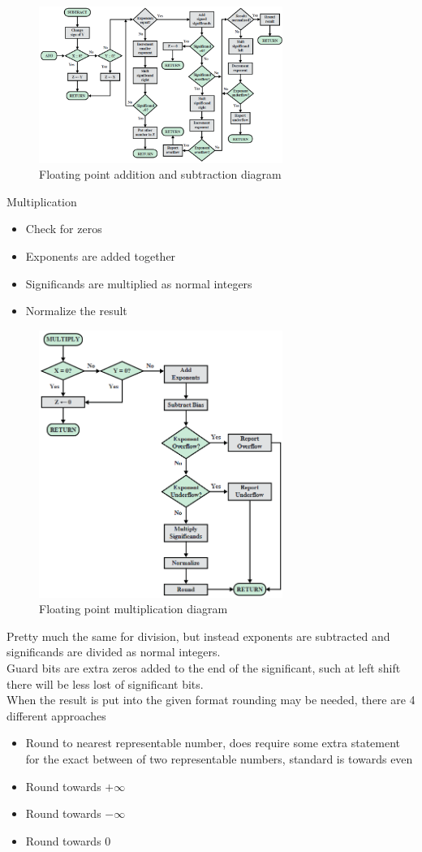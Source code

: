 \documentclass[12pt, a4paper]{article}
\begin{document}
			\begin{figure}[h!]
				\includegraphics[width=300px]{assets/floatingpointAddSub.png}
				\centering
				\caption{Floating point addition and subtraction diagram}
			\end{figure}
			Multiplication
			\begin{itemize}
				\item Check for zeros
				\item Exponents are added together
				\item Significands are multiplied as normal integers
				\item Normalize the result
			\end{itemize}
			\begin{figure}[h!]
				\includegraphics[width=300px]{assets/floatingpointMulti.png}
				\centering
				\caption{Floating point multiplication diagram}
			\end{figure}
			Pretty much the same for division, but instead exponents are subtracted and significands are divided as normal integers.\\
			Guard bits are extra zeros added to the end of the significant, such at left shift there will be less lost of significant bits.\\
			When the result is put into the given format rounding may be needed, there are 4 different approaches
			\begin{itemize}
				\item Round to nearest representable number, does require some extra statement for the exact between of two representable numbers, standard is towards even
				\item Round towards $+\infty$
				\item Round towards $-\infty$
				\item Round towards 0
			\end{itemize}
			 
		
			
\end{document}
